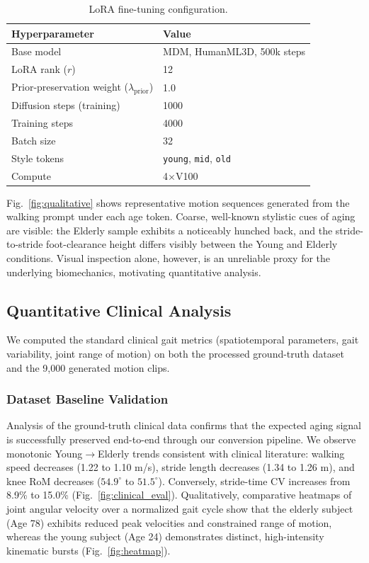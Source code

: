 \begin{table}[H]
    \centering
    \caption{LoRA fine-tuning configuration.}
    \label{tab:lora_config}
    \begin{tabular}{ll}
        \toprule
        \textbf{Hyperparameter} & \textbf{Value} \\
        \midrule
        Base model & MDM, HumanML3D, 500k steps \\
        LoRA rank ($r$) & 12 \\
        Prior-preservation weight ($\lambda_\text{prior}$) & 1.0 \\
        Diffusion steps (training) & 1000 \\
        Training steps & 4000 \\
        Batch size & 32 \\
        Style tokens & \texttt{young}, \texttt{mid}, \texttt{old} \\
        Compute & 4$\times$V100 \\
        \bottomrule
    \end{tabular}
\end{table}

Fig.~\ref{fig:qualitative} shows representative motion sequences generated from the walking prompt under each age token.
Coarse, well-known stylistic cues of aging are visible: the Elderly sample exhibits a noticeably hunched back, and the stride-to-stride foot-clearance height differs visibly between the Young and Elderly conditions.
Visual inspection alone, however, is an unreliable proxy for the underlying biomechanics, motivating quantitative analysis.

\subsection{Quantitative Clinical Analysis}
\label{sec:exp-clinical}

We computed the standard clinical gait metrics (spatiotemporal parameters, gait variability, joint range of motion) on both the processed ground-truth dataset and the 9{,}000 generated motion clips.

\subsubsection{Dataset Baseline Validation}
Analysis of the ground-truth clinical data confirms that the expected aging signal is successfully preserved end-to-end through our conversion pipeline.
We observe monotonic Young$\to$Elderly trends consistent with clinical literature: walking speed decreases (1.22 to 1.10 m/s), stride length decreases (1.34 to 1.26 m), and knee RoM decreases ($54.9^\circ$ to $51.5^\circ$).
Conversely, stride-time CV increases from 8.9\% to 15.0\% (Fig.~\ref{fig:clinical_eval}).
Qualitatively, comparative heatmaps of joint angular velocity over a normalized gait cycle show that the elderly subject (Age 78) exhibits reduced peak velocities and constrained range of motion, whereas the young subject (Age 24) demonstrates distinct, high-intensity kinematic bursts (Fig.~\ref{fig:heatmap}).

